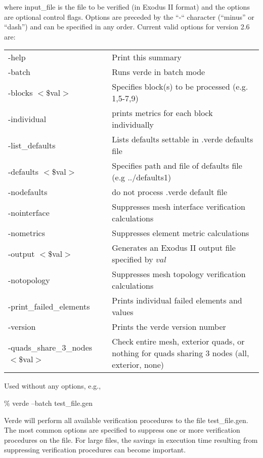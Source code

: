 \documentclass[10pt]{report}
\begin{document}
where input\_file is the file to be verified (in Exodus II format) and 
the options are optional control flags.  Options are preceded by the 
``-`` character (``minus'' or ``dash'') and can be specified in any 
order. Current valid options for version 2.6 are:

\begin{center}
\begin{tabular}{lp{4in}}
-help            & Print this summary                                     \\
-batch           & Runs verde in batch mode                               \\
-blocks $<$\$val$>$  & Specifies block(s) to be processed (e.g. 1,5-7,9)  \\
-individual      & prints metrics for each block individually             \\
-list\_defaults  & Lists defaults settable in .verde defaults file        \\
-defaults $<$\$val$>$ & Specifies path and file of defaults file (e.g ../defaults1) \\
-nodefaults      & do not process .verde default file                     \\
-nointerface     & Suppresses mesh interface verification calculations    \\
-nometrics       & Suppresses element metric calculations                 \\
-output $<$\$val$>$ & Generates an Exodus II output file specified by $val$   \\
-notopology &Suppresses mesh topology verification calculations           \\
-print\_failed\_elements & Prints individual failed elements and values   \\
-version                 & Prints the verde version number                \\
-quads\_share\_3\_nodes $<$\$val$>$ & Check entire mesh, exterior quads, 
or nothing for quads sharing 3 nodes (all, exterior, none)                   \\
\end{tabular}
\end{center}

Used without any options, e.g.,

\begin{center}
\% verde --batch test\_file.gen
\end{center}

Verde will perform all available verification procedures to the file 
test\_file.gen.  The most common options are specified to suppress one 
or more verification procedures on the file.  For large files, the 
savings in execution time resulting from suppressing verification 
procedures can become important.
\end{document}
